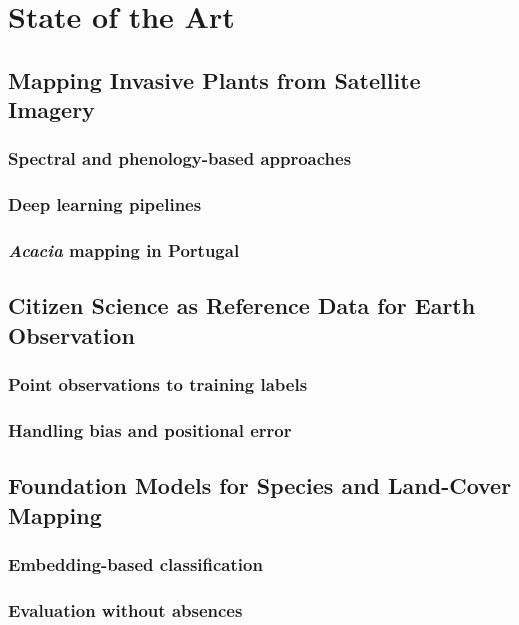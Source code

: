 \chapter{State of the Art}
\label{sec:state-of-the-art}


\section{Mapping Invasive Plants from Satellite Imagery}
\label{sec:sota-mapping}

\subsection{Spectral and phenology-based approaches}
\label{sec:sota-mapping-spectral}
\todo[inline]{}

\subsection{Deep learning pipelines}
\label{sec:sota-mapping-dl}
\todo[inline]{}

\subsection{\emph{Acacia} mapping in Portugal}
\label{sec:sota-mapping-acacia}
\todo[inline]{}

\section{Citizen Science as Reference Data for Earth Observation}
\label{sec:sota-cs}

\subsection{Point observations to training labels}
\label{sec:sota-cs-labels}
\todo[inline]{}

\subsection{Handling bias and positional error}
\label{sec:sota-cs-bias}
\todo[inline]{}

\section{Foundation Models for Species and Land-Cover Mapping}
\label{sec:sota-fm}

\subsection{Embedding-based classification}
\label{sec:sota-fm-classification}
\todo[inline]{}

\subsection{Evaluation without absences}
\label{sec:sota-fm-evaluation}
